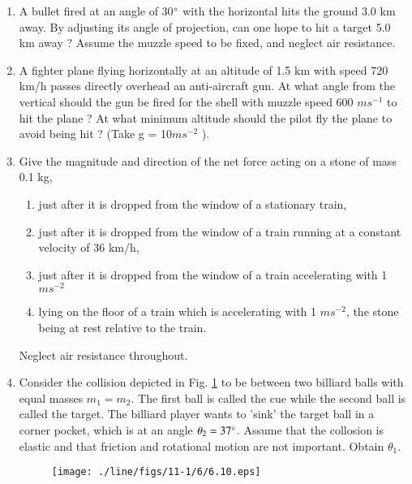 \begin{enumerate}[label=\arabic*.,ref=\thesubsection.\theenumi]
\item A bullet fired at an angle of 30$\degree$ with the horizontal hits the ground 3.0 km away. By adjusting its angle of projection, can one hope to hit a target 5.0 km away ? Assume the muzzle speed to be fixed, and neglect air resistance.
\item  A fighter plane flying horizontally at an altitude of 1.5 km with speed 720 km/h passes directly overhead an anti-aircraft gun. At what angle from the vertical should the gun be fired for the shell with muzzle speed 600 $m s^{-1}$ to hit the plane ? 
At what minimum  altitude should the pilot fly the plane to avoid being hit ? (Take g = 10$ m s^{-2}$
).
\item Give the magnitude and direction of the net force acting on a stone of mass 0.1 kg, 
\begin{enumerate}
\item  just after it is dropped from the window of a stationary train, 
\item  just after it is dropped from the window of a train running at a constant velocity of 36 km/h,
\item  just after it is dropped from the window of a train accelerating with 1$ m s^{-2} $
\item  lying on the floor of a train which is accelerating with 1 $m s^{-2}$, the stone being at rest relative to the train.
\end{enumerate}
Neglect air resistance throughout. 

\item Consider the collision depicted in Fig. \ref{fig:6.10} to be between two billiard balls with equal masses $m_1= m_2$.  The first ball is called the cue while the second ball is called the target. The billiard player wants to 'sink' the target ball in a corner pocket, which is at an angle $\theta_2=37\degree$.  Assume that the collosion
is elastic and that friction and rotational motion are not important. Obtain $\theta_1$.
\begin{figure}[!ht]
\centering
\texttt{[image: ./line/figs/11-1/6/6.10.eps]}
\caption{}
\label{fig:6.10}
\end{figure}

\end{enumerate}
